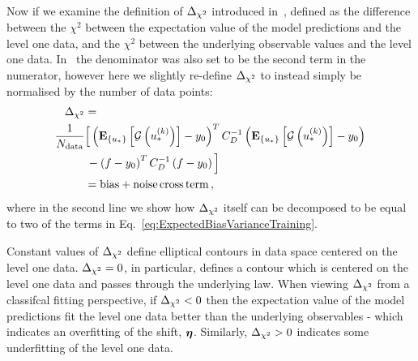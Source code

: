 Now if we examine the definition of $\Delta_{\chi^2}$ introduced
in~\cite{nnpdf30}, defined as the difference between the
$\chi^2$ between the expectation value of the model predictions and the level
one data, and the $\chi^2$ between the underlying observable values and the
level one data. In~\cite{nnpdf30} the denominator was also set to be the
second term in the numerator, however here we slightly re-define
$\Delta_{\chi^2}$ to instead simply be normalised by the number of data points:
\begin{equation}\label{eq:deltachi2def1}
    \begin{split}
        \Delta_{\chi^2} &= \\
            \frac{1}{N_{\rm data}} & \Big[ \left( \mathbf{E}_{\{ u_* \}} \left[ \mathcal{G}\left(u_*^{(k)}\right) \right] - y_0 \right)^T
            C_{D}^{-1}
            \left( \mathbf{E}_{\{ u_* \}} \left[ \mathcal{G}\left(u_*^{(k)}\right) \right] - y_0 \right) \\
            & \, - \left( f - y_0 \right)^T
            C_{D}^{-1}
            \left( f - y_0 \right)
        \Big] \\
        &= {\rm bias} + {\rm noise \, cross \, term} \, ,
    \end{split}
\end{equation}
where in the second line we show how $\Delta_{\chi^2}$ itself can be decomposed to
be equal to two of the terms in Eq.~\ref{eq:ExpectedBiasVarianceTraining}.

Constant values of $\Delta_{\chi^2}$ define elliptical contours in data space
centered on the level one data. $\Delta_{\chi^2} = 0$, in particular, defines a
contour which is centered on the level one data and passes through the
underlying law. When viewing $\Delta_{\chi^2}$ from a classifcal fitting perspective,
if $\Delta_{\chi^2} < 0$ then the expectation value of the model
predictions fit the level one data better than the underlying observables -
which indicates an overfitting of the shift, $\boldsymbol{\eta}$. Similarly,
$\Delta_{\chi^2} > 0$ indicates some underfitting of the level one data.

